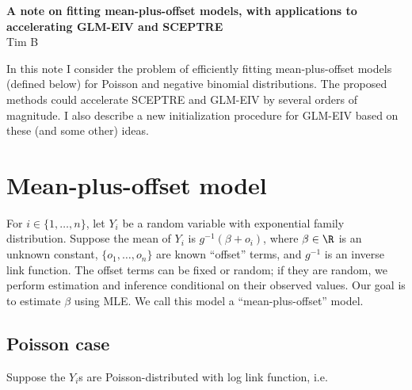 \documentclass[12pt]{article}
\begin{document}
\begin{center}
\textbf{A note on fitting mean-plus-offset models, with applications to accelerating GLM-EIV and SCEPTRE} \\
Tim B
\end{center}

In this note I consider the problem of efficiently fitting mean-plus-offset models (defined below) for Poisson and negative binomial distributions. The proposed methods could accelerate SCEPTRE and GLM-EIV by several orders of magnitude. I also describe a new initialization procedure for GLM-EIV based on these (and some other) ideas.

\section{Mean-plus-offset model}

For $i \in \{ 1, \dots, n \}$, let $Y_i$ be a random variable with exponential family distribution. Suppose the mean of $Y_i$ is $g^{-1}(\beta + o_i)$, where $\beta \in \R$ is an unknown constant, $\{o_1, \dots, o_n\}$ are known ``offset'' terms, and $g^{-1}$ is an inverse link  function. The offset terms can be fixed or random; if they are random, we perform estimation and inference conditional on their observed values. Our goal is to estimate $\beta$ using MLE. We call this model a ``mean-plus-offset'' model.

\subsection{Poisson case}

Suppose the $Y_i$s are Poisson-distributed with log link function, i.e.
\end{document}
